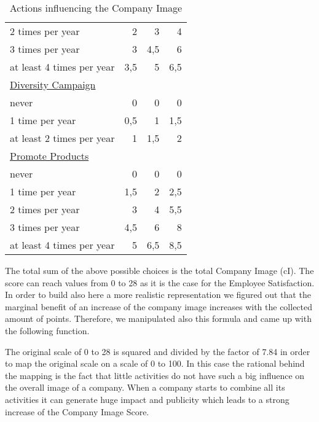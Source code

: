 \begin{table}[]
\begin{tabular}{|l|r|r|r|}
2 times per year                  & 2    & 3      & 4 \\
3 times per year                  & 3    & 4,5    & 6 \\
at least 4 times per year         & 3,5  & 5      & 6,5  \\
\underline{Diversity Campaign}    & & & \\
never                             & 0    & 0      & 0 \\
1 time per year                   & 0,5  & 1      & 1,5  \\
at least 2 times per year         & 1    & 1,5    & 2 \\
\underline{Promote Products} & & & \\
never                             & 0    & 0      & 0 \\
1 time per year                   & 1,5  & 2      & 2,5  \\
2 times per year                  & 3    & 4      & 5,5  \\
3 times per year                  & 4,5  & 6      & 8 \\
at least 4 times per year         & 5    & 6,5    & 8,5  \\
\hline
\end{tabular}
\caption{Actions influencing the Company Image}
\label{calculation_CI}
\end{table}

The total sum of the above possible choices is the total Company Image (\gls{cI}). The score can reach values from 0 to 28 as it is the case for the Employee Satisfaction. In order to build also here a more realistic representation we figured out that the marginal benefit of an increase of the company image increases with the collected amount of points. Therefore, we manipulated also this formula and came up with the following function.


The original scale of 0 to 28 is squared and divided by the factor of 7.84 in order to map the original scale on a scale of 0 to 100. In this case the rational behind the mapping is the fact that little activities do not have such  a big influence on the overall image of a company. When a company starts to combine all its activities it can generate huge impact and publicity which leads to a strong increase of the Company Image Score.